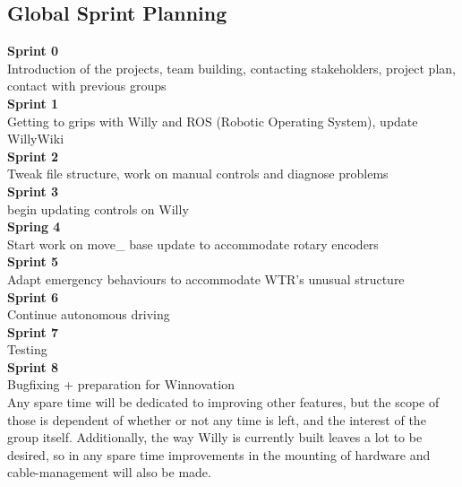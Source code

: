 \subsection{Global Sprint Planning}
\noindent \textbf{Sprint 0}\\
Introduction of the projects, team building, contacting stakeholders, project plan, contact with previous groups\\
\textbf{Sprint 1}\\
Getting to grips with Willy and ROS (Robotic Operating System), update WillyWiki\\
\textbf{Sprint 2}\\
Tweak file structure, work on manual controls and diagnose problems\\
\textbf{Sprint 3}\\
begin updating controls on Willy\\
\textbf{Spring 4}\\
Start work on move\_ base update to accommodate rotary encoders\\
\textbf{Sprint 5}\\
Adapt emergency behaviours to accommodate WTR's unusual structure\\
\textbf{Sprint 6} \\
Continue autonomous driving\\
\textbf{Sprint 7}\\
Testing\\
\textbf{Sprint 8}\\
Bugfixing + preparation for Winnovation \\

Any spare time will be dedicated to improving other features, but the scope of those is dependent of whether or not any time is left, and the interest of the group itself.
Additionally, the way Willy is currently built leaves a lot to be desired, so in any spare time improvements in the mounting of hardware and cable-management will also be made.

\newpage
